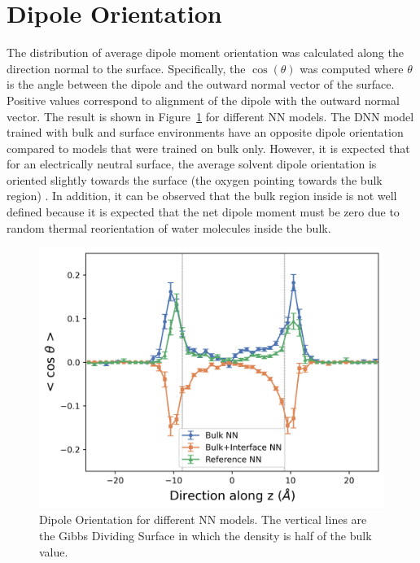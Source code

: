 \section{Dipole Orientation}
The distribution of average dipole moment orientation was calculated along the
direction
normal to the surface. Specifically, the $\cos(\theta)$ was computed where
$\theta$ is
the angle between the dipole and the outward normal vector of the surface.
Positive values correspond to alignment of the dipole with the outward normal
vector. The result is shown in Figure~\ref{fig:dipole_orient} for different NN
models. The DNN model trained with bulk and surface environments have an
opposite dipole
orientation compared to models that were trained on bulk only. However, it is
expected that for an electrically neutral surface, the average solvent dipole
orientation is oriented slightly towards the surface (the oxygen pointing
towards the
bulk region) \cite{WalkerGibbons2022,Kubincova2020}. In addition, it can be
observed that the bulk region inside is not well defined because it is expected
that
the net dipole moment must be zero due to random thermal reorientation of water
molecules
inside the bulk.
\begin{figure}[tbhp!]
  \centering
  \includegraphics[width=0.75\linewidth]{images/dipole_dist_new.png}
  \caption{Dipole Orientation for different NN models. The vertical lines are
    the Gibbs Dividing Surface in which the density is half of the bulk value.
  }
  \label{fig:dipole_orient}
\end{figure}


\clearpage
